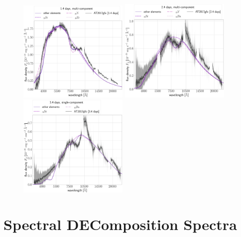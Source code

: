\documentclass[twocolumn, twocolappendix]{aastex63}
\begin{document}
\begin{figure}[!ht]
    \centering
    \includegraphics[width=0.47\textwidth]{figs/appendix/LoO/230503_184337_leaveoneout_all_TARDIS_evals_label-interest-38-39-40.png}
    \includegraphics[width=0.47\textwidth]{figs/appendix/LoO/230504_003423_leaveoneout_all_TARDIS_evals_label-interest-38-39-56.png}
    \includegraphics[width=0.47\textwidth]{figs/appendix/LoO/230628_205804_leaveoneout_all_TARDIS_evals_label-interest-38-56.png}
    \label{fig:leave_out_nonpref}
\end{figure}


\section{Spectral DEComposition Spectra}\label{app:SDEC}
\end{document}

